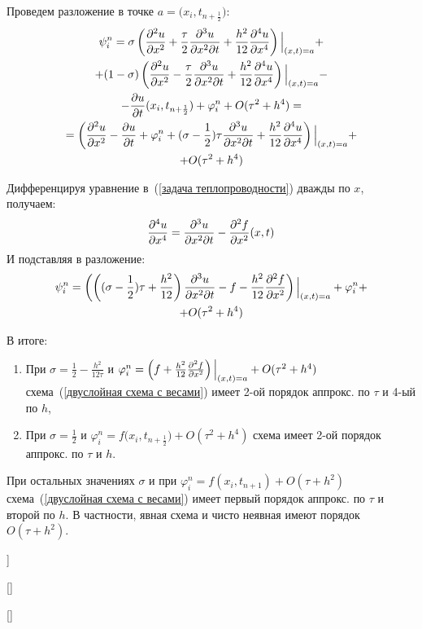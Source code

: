 \begin{Commentwhite}
\newcommand*{\point}{\ensuremath{(x_i,t_{n+\frac{1}{2}}})}
Проведем разложение в точке $a=\point$:
\begin{gather*}
    \psi_i^n = \sigma\left( \deltwo{u}{x} + \frac{\tau}{2}\frac{\partial^3 u}{\partial x^2 \partial t} + \frac{h^2}{12}\deln{u}{x}{4} \right)\Big|_{(x,t)=a} + 
    \\
    + (1 - \sigma)\left( \deltwo{u}{x} - \frac{\tau}{2}\frac{\partial^3 u}{\partial x^2 \partial t} + \frac{h^2}{12}\deln{u}{x}{4} \right)\Big|_{(x,t)=a} -
    \\
    - \del{u}{t}\point + \varphi_i^n + O(\tau^2 + h^4) = 
    \\
    = \left(\deltwo{u}{x} - \del{u}{t} + \varphi_i^n + (\sigma - \frac{1}{2})\tau\frac{\partial^3 u}{\partial x^2 \partial t} + \frac{h^2}{12}\deln{u}{x}{4}\right)\Big|_{(x,t)=a} + 
    \\
    + O(\tau^2 + h^4)
\end{gather*}

Дифференцируя уравнение в~(\ref{задача теплопроводности}) дважды по $x$, получаем:
$$\frac{\partial^{4} u}{\partial x^{4}} = \frac{\partial^3 u}{\partial x^2 \partial t} - \frac{\partial^2 f}{\partial x^2}(x,t)$$
И подставляя в разложение:
\begin{gather*}
    \psi_i^n = \left( \left((\sigma - \frac{1}{2})\tau + \frac{h^2}{12}\right)\frac{\partial^3 u}{\partial x^2 \partial t} - f -\frac{h^2}{12}\frac{\partial^2 f}{\partial x^2} \right)\Big|_{(x,t)=a} + \varphi_i^n +
    \\
    + O(\tau^2 + h^4)
\end{gather*}

В итоге:
\begin{enumerate}
    \item При $\sigma = \frac{1}{2} - \frac{h^2}{12\tau}$ и $\varphi_i^n = \left(f + \frac{h^2}{12}\frac{\partial^2 f}{\partial x^2}\right)\Big|_{(x,t)=a} + O(\tau^2 + h^4)$ схема~(\ref{двуслойная схема с весами}) имеет 2-ой порядок аппрокс. по $\tau$ и 4-ый по $h$,
    \item При $\sigma = \frac{1}{2}$ и $\varphi_i^n = f\point + O(\tau^2 + h^4)$ схема имеет 2-ой порядок аппрокс. по $\tau$ и $h$.
\end{enumerate}

При остальных значениях $\sigma$ и при $\varphi_i^n = f(x_i, t_{n+1}) + O(\tau + h^2)$ схема~(\ref{двуслойная схема с весами}) имеет первый порядок аппрокс. по $\tau$ и второй по $h$. В частности, явная схема и чисто неявная имеют порядок $O(\tau + h^2)$.
\end{Commentwhite}


\bigbreak
[\cite[41-42]{chmmf}]

[\cite[272-273, 276-279]{Samarski}]

[\cite[259-261]{tickets2022}]
